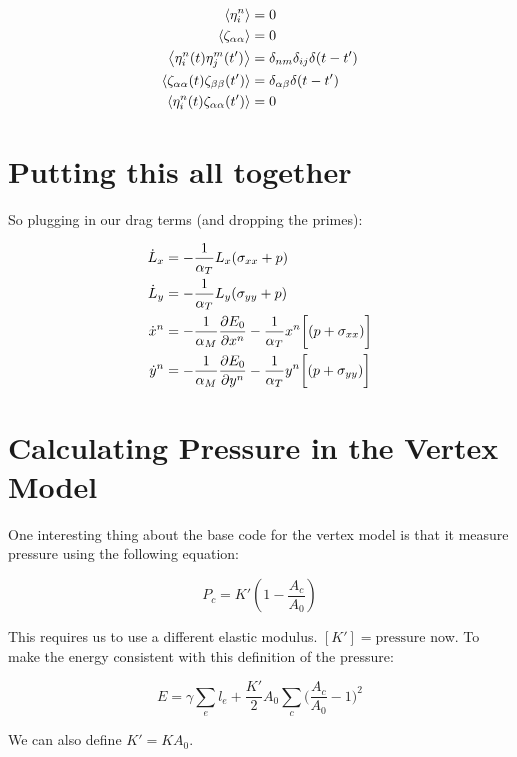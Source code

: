 \documentclass[12pt]{article}
\begin{document}
\begin{center}
\begin{equation}
\begin{split}
\expval{\eta_i^n} &= 0\\
\expval{\zeta_{\alpha\alpha}} &= 0\\
\expval{\eta_i^n(t) \eta_j^m(t') } &= \delta_{nm} \delta_{ij} \delta(t-t')\\
\expval{\zeta_{\alpha\alpha}(t) \zeta_{\beta\beta}(t')} &= \delta_{\alpha\beta} \delta(t-t')\\
\expval{\eta_i^n(t) \zeta_{\alpha\alpha}(t')} &= 0\\
\end{split}
\end{equation}
\end{center}
\section{Putting this all together}
So plugging in our drag terms (and dropping the primes):
\begin{center}
\begin{equation}
\label{eqn: fullimplementdyn}
\begin{split}
\dot{L}_x &= -\frac{1}{\alpha_T} L_{x} (\sigma_{xx} + p)\\
\dot{L}_y &= -\frac{1}{\alpha_T} L_{y} (\sigma_{yy} + p)\\
\dot{x}^n &= -\frac{1}{\alpha_M}  \pdv{E_0}{x^n} - \frac{1}{\alpha_T}x^n \bigg[ (p + \sigma_{xx})\bigg]\\
\dot{y}^n &= -\frac{1}{\alpha_M}  \pdv{E_0}{y^n} - \frac{1}{\alpha_T} y^n \bigg[ (p + \sigma_{yy})\bigg]\\
\end{split}
\end{equation}
\end{center}
\section{Calculating Pressure in the Vertex Model}
One interesting thing about the base code for the vertex model is that it measure pressure using the following equation:
\begin{center}
\begin{equation}
\label{eqn: getpressure}
P_c = K' ( 1 - \frac{A_c}{A_0} )
\end{equation}
\end{center}
This requires us to use a different elastic modulus. $[K'] = \text{pressure}$ now. To make the energy consistent with this definition of the pressure:
\begin{center}
\begin{equation}
E = \gamma \sum\limits_e l_e + \frac{K'}{2} A_0 \sum\limits_c \bigg(\frac{A_c}{A_0}-1\bigg)^2
\end{equation}
\end{center}
We can also define $K' = K A_0$.\\ \\
\end{document}
